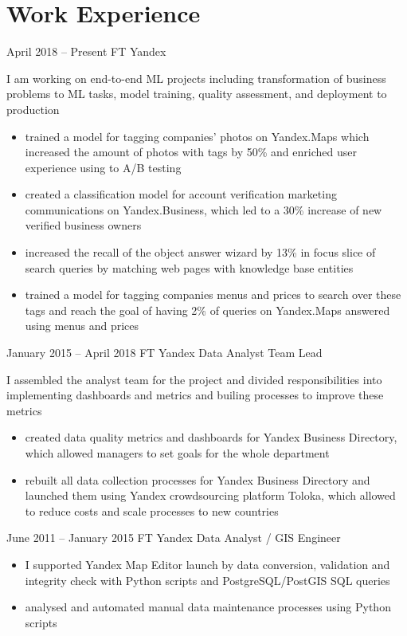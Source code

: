 \section{Work Experience}

\jobentry
    {April 2018 -- Present}
    {FT}
    {Yandex}
    {\currentPosition}
    {
        I am working on end-to-end ML projects including transformation of business problems to ML tasks, model training, quality assessment, and deployment to production
        \begin{itemize}
            \item trained a model for tagging companies' photos on Yandex.Maps which increased the amount of photos with tags by 50\% and enriched user experience using to A/B testing
            \item created a classification model for account verification marketing communications on Yandex.Business, which led to a 30\% increase of new verified business owners
            \item increased the recall of the object answer wizard by 13\% in focus slice of search queries by matching web pages with knowledge base entities
            \item trained a model for tagging companies menus and prices to search over these tags and reach the goal of having 2\% of queries on Yandex.Maps answered using menus and prices
        \end{itemize}
    }

\hrulefill

\jobentry
    {January 2015 -- April 2018}
    {FT}
    {Yandex}
    {Data Analyst Team Lead}
    {
        I assembled the analyst team for the project and divided responsibilities into implementing dashboards and metrics and builing processes to improve these metrics 
        \begin{itemize}
            \item created data quality metrics and dashboards for Yandex Business Directory, which allowed managers to set goals for the whole department
            \item rebuilt all data collection processes for Yandex Business Directory and launched them using Yandex crowdsourcing platform Toloka, which allowed to reduce costs and scale processes to new countries
        \end{itemize}
    }

\hrulefill

\jobentry
    {June 2011 -- January 2015}
    {FT}
    {Yandex}
    {Data Analyst / GIS Engineer}
    {
        \begin{itemize}[topsep=0pt]
            \item I supported Yandex Map Editor launch by data conversion, validation and integrity check with Python scripts and PostgreSQL/PostGIS SQL queries
            \item analysed and automated manual data maintenance processes using Python scripts
        \end{itemize}
    }
